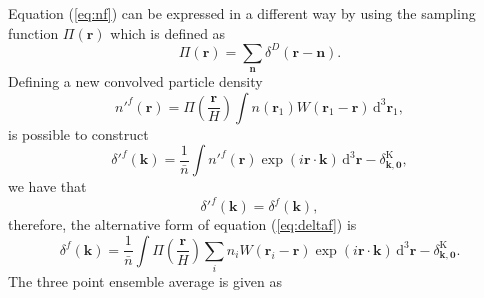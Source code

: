 \documentclass[a4paper,fleqn,usenatbib]{mnras}
\begin{document}
Equation (\ref{eq:nf}) can be expressed in a different way by using the sampling 
function
$\Pi(\mathbf{r})$ which is defined as
\begin{equation}	
  \Pi(\mathbf{r}) = \sum_\mathbf{n} \delta^D(\mathbf{r}-\mathbf{n}).
\end{equation}
Defining a new convolved particle density
\begin{equation}
  n'^f(\mathbf{r}) = \Pi\left(\frac{\mathbf{r}}{H}\right) \int n(\mathbf{r}_1) 
  W(\mathbf{r}_1-\mathbf{r})\,\text{d}^3\mathbf{r}_1,
\end{equation}
is possible to construct
\begin{equation}
  \delta'^f(\mathbf{k}) = \frac{1}{\bar{n}}
  \int n'^f(\mathbf{r})\exp(i\mathbf{r}\cdot\mathbf{k})\,\text{d}^3\mathbf{r}
  -\delta^\text{K}_{\mathbf{k},\mathbf{0}} \label{eq:deltaf},
\end{equation}
we have that \citep{Jing2005}
\begin{equation}
 \delta'^f(\mathbf{k})=\delta^f(\mathbf{k}),
\end{equation}
therefore, the alternative form of equation (\ref{eq:deltaf}) is
\begin{equation}
  \delta^f(\mathbf{k}) = \frac{1}{\bar{n}}
  \int \Pi\left(\frac{\mathbf{r}}{H}\right) \sum_i n_i W(\mathbf{r}_i-\mathbf{r})\exp(i\mathbf{r}\cdot\mathbf{k})\,\text{d}^3\mathbf{r}
  -\delta^\text{K}_{\mathbf{k},\mathbf{0}}.
\end{equation}
The three point ensemble average is given as
\end{document}
